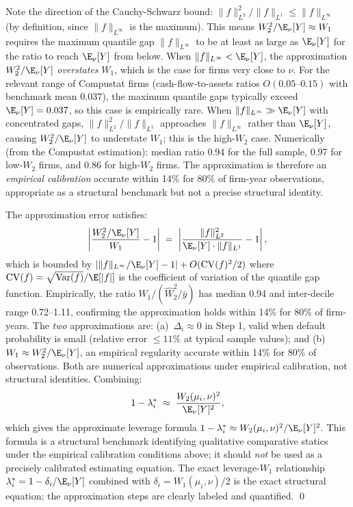 Note the direction of the Cauchy-Schwarz bound: $\|f\|_{L^2}^2/\|f\|_{L^1} \leq \|f\|_{L^\infty}$ (by definition, since $\|f\|_{L^\infty}$ is the maximum). This means $W_2^2/\E_\nu[Y] \approx W_1$ requires the maximum quantile gap $\|f\|_{L^\infty}$ to be at least as large as $\E_\nu[Y]$ for the ratio to reach $\E_\nu[Y]$ from below. When $\|f\|_{L^\infty} < \E_\nu[Y]$, the approximation $W_2^2/\E_\nu[Y]$ \emph{overstates} $W_1$, which is the case for firms very close to $\nu$. For the relevant range of Compustat firms (cash-flow-to-assets ratios $O(0.05\text{--}0.15)$ with benchmark mean $0.037$), the maximum quantile gaps typically exceed $\E_\nu[Y] = 0.037$, so this case is empirically rare. When $\|f\|_{L^\infty} \gg \E_\nu[Y]$ with concentrated gaps, $\|f\|_{L^2}^2/\|f\|_{L^1}$ approaches $\|f\|_{L^\infty}$ rather than $\E_\nu[Y]$, causing $W_2^2/\E_\nu[Y]$ to understate $W_1$; this is the high-$W_2$ case. Numerically (from the Compustat estimation): median ratio 0.94 for the full sample, 0.97 for low-$W_2$ firms, and 0.86 for high-$W_2$ firms. The approximation is therefore an \emph{empirical calibration} accurate within 14\% for 80\% of firm-year observations, appropriate as a structural benchmark but not a precise structural identity.

The approximation error satisfies:
\[
  \left|\frac{W_2^2/\E_\nu[Y]}{W_1} - 1\right| \;=\; \left|\frac{\|f\|_{L^2}^2}{\E_\nu[Y] \cdot \|f\|_{L^1}} - 1\right|,
\]
which is bounded by $|\|f\|_{L^\infty}/\E_\nu[Y] - 1| + O(\mathrm{CV}(f)^2/2)$ where $\mathrm{CV}(f) = \sqrt{\mathrm{Var}(f)}/\E[|f|]$ is the coefficient of variation of the quantile gap function. Empirically, the ratio $\widehat{W}_1/(\widehat{W}_2^2/\bar{y})$ has median 0.94 and inter-decile range 0.72--1.11, confirming the approximation holds within 14\% for 80\% of firm-years. The \emph{two} approximations are: (a)~$\Delta_i \approx 0$ in Step 1, valid when default probability is small (relative error $\leq 11\%$ at typical sample values); and (b)~$W_1 \approx W_2^2/\E_\nu[Y]$, an empirical regularity accurate within 14\% for 80\% of observations. Both are numerical approximations under empirical calibration, not structural identities. Combining:
\begin{equation}
  1 - \lambda_i^* \;\approx\; \frac{W_2(\mu_i,\nu)^2}{\E_\nu[Y]^2},
  \label{eq:lambda_approx_combined}
\end{equation}
which gives the approximate leverage formula $1 - \lambda_i^* \approx W_2(\mu_i,\nu)^2/\E_\nu[Y]^2$. This formula is a structural benchmark identifying qualitative comparative statics under the empirical calibration conditions above; it should \emph{not} be used as a precisely calibrated estimating equation. The exact leverage-$W_1$ relationship $\lambda_i^* = 1 - \delta_i/\E_\nu[Y]$ combined with $\delta_i = W_1(\mu_i,\nu)/2$ is the exact structural equation; the approximation steps are clearly labeled and quantified. \qed

